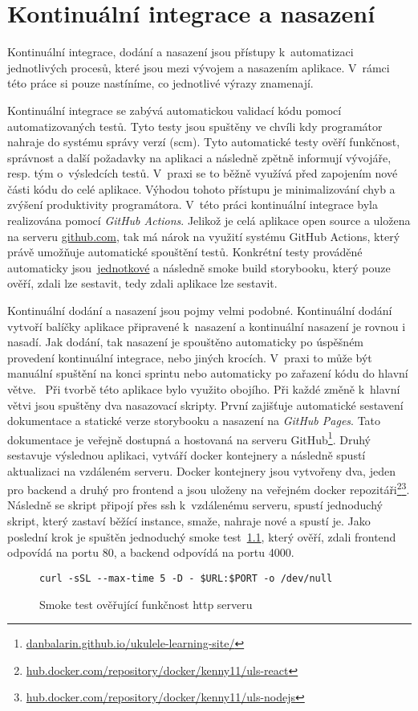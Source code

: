 \chapter{Kontinuální integrace a nasazení}
\label{ch:ci_cd}
Kontinuální integrace, dodání a nasazení jsou přístupy k~automatizaci jednotlivých procesů, které jsou mezi vývojem a nasazením aplikace. V~rámci této práce si pouze nastíníme, co jednotlivé výrazy znamenají.

Kontinuální integrace se zabývá automatickou validací kódu pomocí automatizovaných testů. Tyto testy jsou spuštěny ve chvíli kdy programátor nahraje do systému správy verzí (\acrshort{scm}). Tyto automatické testy ověří funkčnost, správnost a další požadavky na aplikaci a následně zpětně informují vývojáře, resp. tým o~výsledcích testů. V~praxi se to běžně využívá před zapojením nové části kódu do celé aplikace. Výhodou tohoto přístupu je minimalizování chyb a zvýšení produktivity programátora. V~této práci kontinuální integrace byla realizována pomocí \emph{GitHub Actions}. Jelikož je celá aplikace open source a uložena na serveru \href{www.github.com}{github.com}, tak má nárok na využití systému GitHub Actions, který právě umožňuje automatické spouštění testů. Konkrétní testy prováděné automaticky jsou~\hyperref[sc:unit_tests]{jednotkové} a následně smoke build storybooku, který pouze ověří, zdali lze sestavit, tedy zdali aplikace lze sestavit.~\cite[s.~7]{rossel_2017_continuous}

Kontinuální dodání a nasazení jsou pojmy velmi podobné. Kontinuální dodání vytvoří balíčky aplikace připravené k~nasazení a kontinuální nasazení je rovnou i nasadí. Jak dodání, tak nasazení je spouštěno automaticky po úspěšném provedení kontinuální integrace, nebo jiných krocích. V~praxi to může být manuální spuštění na konci sprintu nebo automaticky po zařazení kódu do hlavní větve.~\cite[s.~18]{rossel_2017_continuous} Při tvorbě této aplikace bylo využito obojího. Při každé změně k~hlavní větvi jsou spuštěny dva nasazovací skripty. První zajišťuje automatické sestavení dokumentace a statické verze storybooku a nasazení na \emph{GitHub Pages}. Tato dokumentace je veřejně dostupná a hostovaná na serveru GitHub\footnote{\href{https://danbalarin.github.io/ukulele-learning-site/}{danbalarin.github.io/ukulele-learning-site/}}. Druhý sestavuje výslednou aplikaci, vytváří docker kontejnery a následně spustí aktualizaci na vzdáleném serveru. Docker kontejnery jsou vytvořeny dva, jeden pro backend a druhý pro frontend a jsou uloženy na veřejném docker repozitáři\footnote{\href{https://hub.docker.com/repository/docker/kenny11/uls-react}{hub.docker.com/repository/docker/kenny11/uls-react}}\footnote{\href{https://hub.docker.com/repository/docker/kenny11/uls-nodejs}{hub.docker.com/repository/docker/kenny11/uls-nodejs}}. Následně se skript připojí přes ssh k~vzdálenému serveru, spustí jednoduchý skript, který zastaví běžící instance, smaže, nahraje nové a spustí je. Jako poslední krok je spuštěn jednoduchý smoke test~\ref{code:smoke}, který ověří, zdali frontend odpovídá na portu 80, a backend odpovídá na portu 4000.

\begin{figure}[h!]
    \centering
    \begin{verbatim}
curl -sSL --max-time 5 -D - $URL:$PORT -o /dev/null
    \end{verbatim}
    \caption{Smoke test ověřující funkčnost http serveru}
    \label{code:smoke}
\end{figure}
